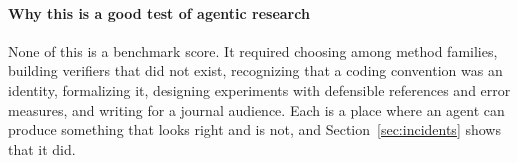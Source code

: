 \paragraph{Why this is a good test of agentic research}
None of this is a benchmark score. It required choosing among method families, building verifiers
that did not exist, recognizing that a coding convention was an identity, formalizing it, designing
experiments with defensible references and error measures, and writing for a journal audience.
Each is a place where an agent can produce something that looks right and is not, and
Section~\ref{sec:incidents} shows that it did.
